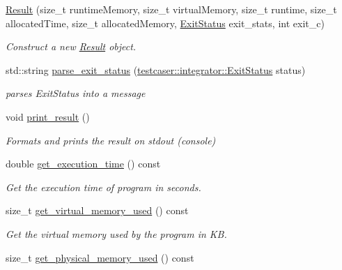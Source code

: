 \begin{DoxyCompactItemize}
\item 
\mbox{\hyperlink{classtestcaser_1_1integrator_1_1Result_a74713e8425d62a6ea2e349b8255e3a95}{Result}} (size\+\_\+t runtime\+Memory, size\+\_\+t virtual\+Memory, size\+\_\+t runtime, size\+\_\+t allocated\+Time, size\+\_\+t allocated\+Memory, \mbox{\hyperlink{namespacetestcaser_1_1integrator_a68fcfdfd3f063954e9fd1a94f4b4f755}{Exit\+Status}} exit\+\_\+stats, int exit\+\_\+c)
\begin{DoxyCompactList}\small\item\em Construct a new \mbox{\hyperlink{classtestcaser_1_1integrator_1_1Result}{Result}} object. \end{DoxyCompactList}\item 
std\+::string \mbox{\hyperlink{classtestcaser_1_1integrator_1_1Result_a8803ea04076142e32e6784f0324b7186}{parse\+\_\+exit\+\_\+status}} (\mbox{\hyperlink{namespacetestcaser_1_1integrator_a68fcfdfd3f063954e9fd1a94f4b4f755}{testcaser\+::integrator\+::\+Exit\+Status}} status)
\begin{DoxyCompactList}\small\item\em parses Exit\+Status into a message \end{DoxyCompactList}\item 
void \mbox{\hyperlink{classtestcaser_1_1integrator_1_1Result_a941ae470ca06388faff84e0a3bf3e5e0}{print\+\_\+result}} ()
\begin{DoxyCompactList}\small\item\em Formats and prints the result on stdout (console) \end{DoxyCompactList}\item 
double \mbox{\hyperlink{classtestcaser_1_1integrator_1_1Result_a6e6516249a0502cc5031760436b81c3c}{get\+\_\+execution\+\_\+time}} () const
\begin{DoxyCompactList}\small\item\em Get the execution time of program in seconds. \end{DoxyCompactList}\item 
size\+\_\+t \mbox{\hyperlink{classtestcaser_1_1integrator_1_1Result_a72b4929256f610e35f244412bb14b38d}{get\+\_\+virtual\+\_\+memory\+\_\+used}} () const
\begin{DoxyCompactList}\small\item\em Get the virtual memory used by the program in KB. \end{DoxyCompactList}\item 
size\+\_\+t \mbox{\hyperlink{classtestcaser_1_1integrator_1_1Result_a7512baef0e0dc77c8543972917852dfa}{get\+\_\+physical\+\_\+memory\+\_\+used}} () const

\end{DoxyCompactItemize}
